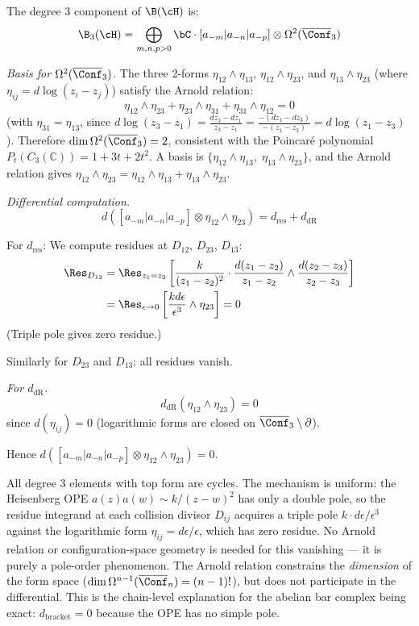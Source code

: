 \begin{computation}\label{comp:heisenberg-deg3-full}
The degree 3 component of $\B(\cH)$ is:
\[
\B_3(\cH) = \bigoplus_{m,n,p > 0} \bC \cdot [a_{-m}|a_{-n}|a_{-p}] \otimes \Omega^2(\overline{\Conf}_3)
\]

\emph{Basis for $\Omega^2(\overline{\Conf}_3)$.}
The three 2-forms $\eta_{12} \wedge \eta_{13}$, $\eta_{12} \wedge \eta_{23}$, and $\eta_{13} \wedge \eta_{23}$ (where $\eta_{ij} = d\log(z_i - z_j)$) satisfy the Arnold relation:
\[
\eta_{12} \wedge \eta_{23} + \eta_{23} \wedge \eta_{31} + \eta_{31} \wedge \eta_{12} = 0
\]
(with $\eta_{31} = \eta_{13}$, since $d\log(z_3 - z_1) = \frac{dz_3 - dz_1}{z_3 - z_1} = \frac{-(dz_1 - dz_3)}{-(z_1 - z_3)} = d\log(z_1 - z_3)$).  Therefore $\dim \Omega^2(\overline{\Conf}_3) = 2$, consistent with the Poincar\'{e} polynomial $P_t(C_3(\mathbb{C})) = 1 + 3t + 2t^2$.  A basis is $\{\eta_{12} \wedge \eta_{13},\; \eta_{13} \wedge \eta_{23}\}$, and the Arnold relation gives $\eta_{12} \wedge \eta_{23} = \eta_{12} \wedge \eta_{13} + \eta_{13} \wedge \eta_{23}$.

\emph{Differential computation.}
\[
d([a_{-m}|a_{-n}|a_{-p}] \otimes \eta_{12} \wedge \eta_{23}) = d_{\text{res}} + d_{\text{dR}}
\]

For $d_{\text{res}}$: We compute residues at $D_{12}$, $D_{23}$, $D_{13}$:
\begin{align*}
\Res_{D_{12}} &= \Res_{z_1 = z_2}\left[\frac{k}{(z_1-z_2)^2} \cdot \frac{d(z_1-z_2)}{z_1-z_2} \wedge \frac{d(z_2-z_3)}{z_2-z_3}\right] \\
&= \Res_{\epsilon \to 0}\left[\frac{k d\epsilon}{\epsilon^3} \wedge \eta_{23}\right] = 0
\end{align*}
(Triple pole gives zero residue.)

Similarly for $D_{23}$ and $D_{13}$: all residues vanish.

\emph{For $d_{\text{dR}}$.}
\[
d_{\text{dR}}(\eta_{12} \wedge \eta_{23}) = 0
\]
since $d(\eta_{ij}) = 0$ (logarithmic forms are closed on $\overline{\Conf}_3 \setminus \partial$).

Hence $d([a_{-m}|a_{-n}|a_{-p}] \otimes \eta_{12} \wedge \eta_{23}) = 0$.

All degree 3 elements with top form are cycles.
The mechanism is uniform: the Heisenberg OPE $a(z)a(w) \sim k/(z-w)^2$ has only a double pole, so the residue integrand at each collision divisor $D_{ij}$ acquires a triple pole $k \cdot d\epsilon/\epsilon^3$ against the logarithmic form $\eta_{ij} = d\epsilon/\epsilon$, which has zero residue.  No Arnold relation or configuration-space geometry is needed for this vanishing --- it is purely a pole-order phenomenon.  The Arnold relation constrains the \emph{dimension} of the form space ($\dim \Omega^{n-1}(\overline{\Conf}_n) = (n-1)!$), but does not participate in the differential.  This is the chain-level explanation for the abelian bar complex being exact: $d_{\mathrm{bracket}} = 0$ because the OPE has no simple pole.
\end{computation}

